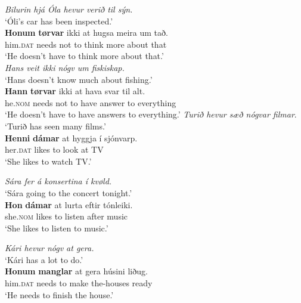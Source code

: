 \documentclass[output=paper]{LSP/langsci}
\begin{document}
\ea%
    \label{ex:Thrainsson:10}
	\begin{xlist}[a2.]
	\label{ex:Thrainsson:10a1}
	\textit{Bilurin hjá Óla hevur verið til sýn.}\\
	\glt ‘Óli’s car has been inspected.’\\
	\gll \textbf{Honum}   \textbf{tørvar}   ikki   at   hugsa   meira   um   tað.\\
		him\textsc{.dat}  needs    not    to  think    more  about  that\\
	\glt ‘He doesn’t have to think more about that.’\\

	  \label{ex:Thrainsson:10a2}
	\textit{Hans veit ikki nógv um fiskiskap.}\\
	\glt ‘Hans doesn’t know much about fishing.’\\
	\gll \textbf{Hann} \textbf{tørvar}   ikki   at   hava   svar     til alt.\\
		he\textsc{.nom}  needs    not    to  have  answer  to  everything\\
	\glt ‘He doesn’t have to have answers to everything.’
	\label{ex:Thrainsson:10b1}
	\textit{Turið hevur sæð nógvar filmar}.
	\glt ‘Turið has seen many films.’\\
	\gll \textbf{Henni}   \textbf{dámar}   at   hyggja   í sjónvarp.\\
		  her\textsc{.dat}  likes    to  look    at  TV\\
	\glt ‘She likes to watch TV.’

	\label{ex:Thrainsson:10b2}
	\textit{Sára fer á konsertina í kvøld.}\\
	\glt ‘Sára going to the concert tonight.’\\
	\gll \textbf{Hon}     \textbf{dámar} at   lurta   eftir   tónleiki.\\
		she\textsc{.nom}  likes    to  listen  after  music\\
    \glt ‘She likes to listen to music.’

     \label{ex:Thrainsson:10c1}
    \textit{Kári hevur nógv at gera.}\\
    \glt  ‘Kári has a lot to do.’\\
    \gll  \textbf{Honum}   \textbf{manglar} at   gera   húsini     liðug.\\
           him\textsc{.dat}  needs    to  make  the-houses   ready\\
    \glt ‘He needs to finish the house.’


\end{xlist}
\end{document}
